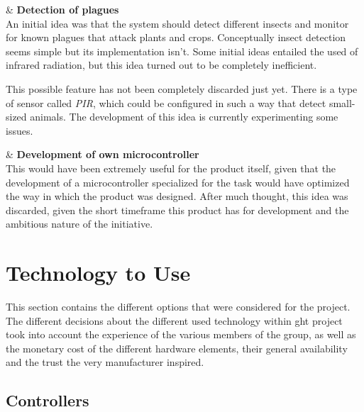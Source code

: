 \documentclass[english,runningheads,a4paper]{llncs}[2018/03/10]
\begin{document}
\begin{easylist}[itemize]

& \textbf{Detection of plagues} \\
An initial idea was that the system should detect different insects and monitor
for known plagues that attack plants and crops. Conceptually insect detection
seems simple but its implementation isn't. Some initial ideas entailed the used
of infrared radiation, but this idea turned out to be completely inefficient.

This possible feature has not been completely discarded just yet. There is a
type of sensor called \textit{PIR}, which could be configured in such a way that
detect small-sized animals. The development of this idea is currently
experimenting some issues.

& \textbf{Development of own microcontroller} \\
This would have been extremely useful for the product itself, given that the
development of a microcontroller specialized for the task would have optimized
the way in which the product was designed. After much thought, this idea was
discarded, given the short timeframe this product has for development and the
ambitious nature of the initiative.

\end{easylist}


\section*{Technology to Use}

This section contains the different options that were considered for the
project. The different decisions about the different used technology within ght
project took into account the experience of the various members of the group, as
well as the monetary cost of the different hardware elements, their general
availability and the trust the very manufacturer inspired.


    \subsection*{Controllers}
\end{document}
